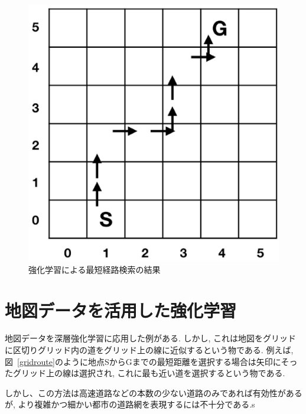 \begin{figure}[H]
    \centering  %
    \includegraphics[clip,width = 13.0cm]{assets/rein_simple.eps}
    \caption{強化学習による最短経路検索の結果}  \label{sample}
\end{figure}
  


\section{地図データを活用した強化学習}

地図データを深層強化学習に応用した例がある. しかし, これは地図をグリッドに区切りグリッド内の道をグリッド上の線に近似するという物である.
例えば, 図~\ref{gridroute}のように地点SからGまでの最短距離を選択する場合は矢印にそったグリッド上の線は選択され, これに最も近い道を選択するという物である.

しかし、この方法は高速道路などの本数の少ない道路のみであれば有効性があるが, より複雑かつ細かい都市の道路網を表現するには不十分である.s

